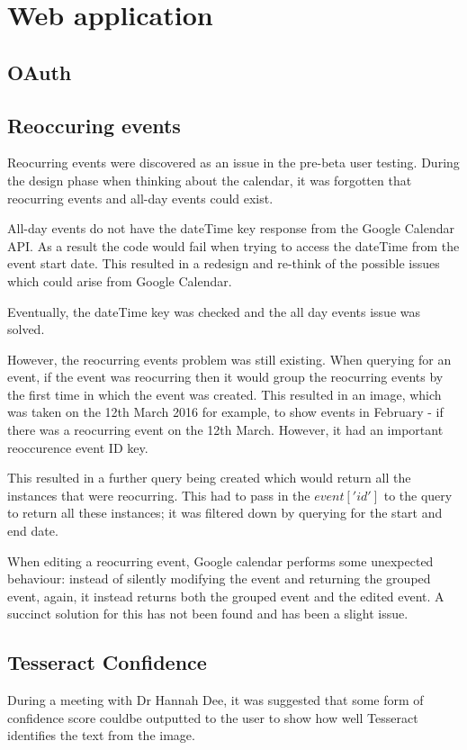 



\section{Web application}

\subsection{OAuth}

\subsection{Reoccuring events}
Reocurring events were discovered as an issue in the pre-beta user testing. During the design phase when thinking about the calendar, it was forgotten that reocurring events and all-day events could exist.

All-day events do not have the dateTime key response from the Google Calendar API. As a result the code would fail when trying to access the dateTime from the event start date. This resulted in a redesign and re-think of the possible issues which could arise from Google Calendar.

Eventually, the dateTime key was checked and the all day events issue was solved.

However, the reocurring events problem was still existing. When querying for an event, if the event was reocurring then it would group the reocurring events by the first time in which the event was created. This resulted in an image, which was taken on the 12th March 2016 for example, to show events in February - if there was a reocurring event on the 12th March. However, it had an important reoccurence event ID key.

This resulted in a further query being created which would return all the instances that were reocurring. This had to pass in the $event['id']$ to the query to return all these instances; it was filtered down by querying for the start and end date.

When editing a reocurring event, Google calendar performs some unexpected behaviour: instead of silently modifying the event and returning the grouped event, again, it instead returns both the grouped event and the edited event. A succinct solution for this has not been found and has been a slight issue.

\subsection{Tesseract Confidence}
During a meeting with Dr Hannah Dee, it was suggested that some form of confidence score couldbe outputted to the user to show how well Tesseract identifies the text from the image.

